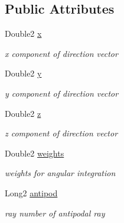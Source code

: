 \subsection*{Public Attributes}
\begin{DoxyCompactItemize}
\item 
\mbox{\label{structRays_a1392458487f0346dfcd3508d6b4704cd}} 
Double2 \mbox{\hyperlink{structRays_a1392458487f0346dfcd3508d6b4704cd}{x}}
\begin{DoxyCompactList}\small\item\em x component of direction vector \end{DoxyCompactList}\item 
\mbox{\label{structRays_aa0326329d8747c3b6f0c7d3b2453af34}} 
Double2 \mbox{\hyperlink{structRays_aa0326329d8747c3b6f0c7d3b2453af34}{y}}
\begin{DoxyCompactList}\small\item\em y component of direction vector \end{DoxyCompactList}\item 
\mbox{\label{structRays_a975eef37042186b4c75bc332bf33151a}} 
Double2 \mbox{\hyperlink{structRays_a975eef37042186b4c75bc332bf33151a}{z}}
\begin{DoxyCompactList}\small\item\em z component of direction vector \end{DoxyCompactList}\item 
\mbox{\label{structRays_a5c5fe776caa7523a97d1e41837897aca}} 
Double2 \mbox{\hyperlink{structRays_a5c5fe776caa7523a97d1e41837897aca}{weights}}
\begin{DoxyCompactList}\small\item\em weights for angular integration \end{DoxyCompactList}\item 
\mbox{\label{structRays_aba543b9ec12d6b7dcd4b96d98e4645c2}} 
Long2 \mbox{\hyperlink{structRays_aba543b9ec12d6b7dcd4b96d98e4645c2}{antipod}}
\begin{DoxyCompactList}\small\item\em ray number of antipodal ray \end{DoxyCompactList}\end{DoxyCompactItemize}


